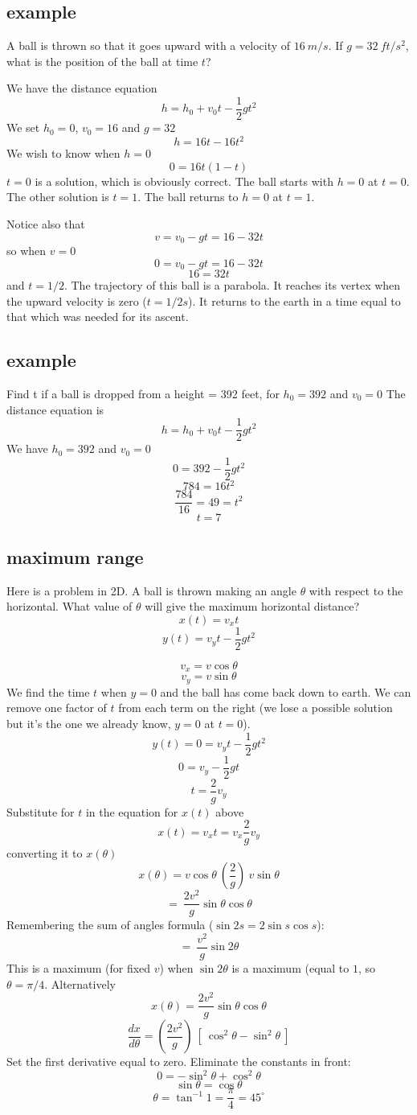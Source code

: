 \documentclass[11pt, oneside]{article}
\begin{document}
\subsection*{example}
A ball is thrown so that it goes upward with a velocity of $16 \ m/s$.  If $g = 32 \ ft/s^2$, what is the position of the ball at time $t$?

We have the distance equation
\[ h = h_0 + v_0 t - \frac{1}{2}gt^2 \]
We set $h_0 = 0$, $v_0 = 16$ and $g = 32$
\[ h = 16 t - 16t^2 \]
We wish to know when $h=0$
\[ 0 = 16 t (1-t) \]
$t=0$ is a solution, which is obviously correct.  The ball starts with $h=0$ at $t=0$.  The other solution is $t=1$.  The ball returns to $h=0$ at $t=1$.

Notice also that 
\[ v = v_0 - gt = 16 -32t \]
so when $v=0$
\[ 0 = v_0 - gt = 16 -32t \]
\[ 16 = 32t \]
and $t=1/2$.  The trajectory of this ball is a parabola.  It reaches its vertex when the upward velocity is zero ($t=1/2 s$).  It returns to the earth in a time equal to that which was needed for its ascent.

\subsection*{example}  
Find t if a ball is dropped from a height = 392 feet, for $h_0 = 392$ and $v_0 = 0$
The distance equation is
\[ h = h_0 + v_0 t - \frac{1}{2}gt^2 \]
We have $h_0 = 392$ and $v_0 = 0$
\[ 0 = 392 - \frac{1}{2}gt^2 \]
\[ 784 = 16t^2 \]
\[ \frac{784}{16} = 49 = t^2 \]
\[ t =7 \]

\subsection*{maximum range}

Here is a problem in 2D.  A ball is thrown making an angle $\theta$ with respect to the horizontal.  What value of $\theta$ will give the maximum horizontal distance?
\[ x(t) = v_x t \]
\[ y(t) = v_y t - \frac{1}{2} g t^2 \]

\[ v_x = v \cos \theta \]
\[ v_y = v \sin \theta \]
We find the time $t$ when $y=0$ and the ball has come back down to earth.  We can remove one factor of $t$ from each term on the right (we lose a possible solution but it's the one we already know, $y=0$ at $t=0$).
\[ y(t) = 0 = v_y t - \frac{1}{2} g t^2 \]
\[ 0 = v_y  - \frac{1}{2} g t \]
\[ t = \frac{2}{g} v_y  \]
Substitute for $t$ in the equation for $x(t)$ above
\[ x(t) = v_x t = v_x \frac{2}{g} v_y  \]
converting it to $x(\theta)$
\[ x(\theta) = v \cos \theta \ (\frac{2}{g}) \ v \sin \theta  \]
\[ = \ \frac{2v^2}{g}  \sin \theta \cos \theta \]
Remembering the sum of angles formula ($\sin 2s = 2 \sin s \cos s$):
\[ = \ \frac{v^2}{g}  \sin 2 \theta \]
This is a maximum (for fixed $v$) when $\sin 2 \theta$ is a maximum (equal to $1$, so $\theta = \pi/4$.
Alternatively
\[ x(\theta) = \frac{2v^2}{g} \sin \theta \cos \theta \]
\[ \frac{dx}{d\theta } = (\frac{2v^2}{g}) \ [ \ \cos^2 \theta - \sin^2 \theta \ ] \]
Set the first derivative equal to zero.  Eliminate the constants in front:
\[ 0 = - \sin^2 \theta + \cos^2 \theta \]
\[ \sin \theta = \cos \theta \]
\[ \theta = \tan^{-1} 1 = \frac{\pi}{4} = 45^\circ \]
\end{document}
